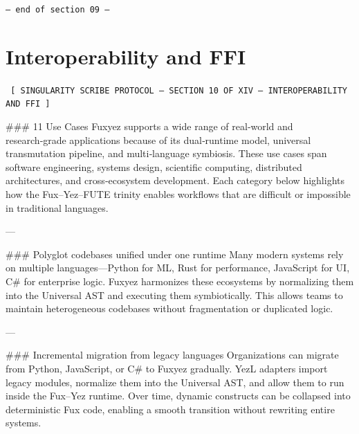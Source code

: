 \documentclass[12pt, a4paper]{book}
\begin{document}
    \vspace{1cm}
    \begin{center}
    \color{alienPurple}\texttt{--- end of section 09 ---}
    \end{center}
    \clearpage
    

    \chapter*{Interoperability and FFI}
    
    
    \begin{glyphbox}
    \centering
    \color{neonCyan}\fontsize{8}{10}\selectfont\texttt{
    [ SINGULARITY SCRIBE PROTOCOL -- SECTION 10 OF XIV -- INTEROPERABILITY AND FFI ]
    }
    \end{glyphbox}
    \vspace{0.3cm}
    
    
    \#\#\# 11 Use Cases  
Fuxyez supports a wide range of real‑world and research‑grade applications because of its dual‑runtime model, universal transmutation pipeline, and multi‑language symbiosis. These use cases span software engineering, systems design, scientific computing, distributed architectures, and cross‑ecosystem development. Each category below highlights how the Fux–Yez–FUTE trinity enables workflows that are difficult or impossible in traditional languages.

---

\#\#\# Polyglot codebases unified under one runtime  
Many modern systems rely on multiple languages—Python for ML, Rust for performance, JavaScript for UI, C\# for enterprise logic. Fuxyez harmonizes these ecosystems by normalizing them into the Universal AST and executing them symbiotically. This allows teams to maintain heterogeneous codebases without fragmentation or duplicated logic.

---

\#\#\# Incremental migration from legacy languages  
Organizations can migrate from Python, JavaScript, or C\# to Fuxyez gradually. YezL adapters import legacy modules, normalize them into the Universal AST, and allow them to run inside the Fux–Yez runtime. Over time, dynamic constructs can be collapsed into deterministic Fux code, enabling a smooth transition without rewriting entire systems.
\end{document}
